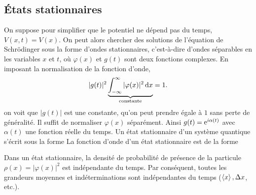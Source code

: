 \documentclass[12pt,fancy]{cours}
\begin{document}
\subsection{États stationnaires}

On suppose pour simplifier que le potentiel ne dépend pas du temps, $V(x,t)=V(x)$. On peut alors chercher des solutions de l'équation de Schrödinger sous la forme d'ondes stationnaires, c’est-à-dire d’ondes séparables en les variables $x$ et $t$,
où $\varphi(x)$ et $g(t)$ sont deux fonctions complexes.
%
En imposant la normalisation de la fonction d'onde,
\begin{equation}
|g(t)|^2\underbrace{\int_{-\infty}^{\infty}|\varphi(x)|^2\,\mathrm{d} x}_{\rm constante}=1.
\end{equation}
on voit que $|g(t)|$ est une constante, qu'on peut prendre égale à $1$ sans perte de généralité. Il suffit de normaliser $\varphi(x)$ séparément. Ainsi $g(t)=\mathrm{e}^{i\alpha(t)}$ avec $\alpha(t)$ une fonction réelle du temps. Un état stationnaire d'un système quantique s'écrit sous la forme
  La fonction d’onde d’un état stationnaire est de la forme




Dans un état stationnaire, la densité de probabilité de présence de la particule $\rho(x)=|\varphi(x)|^2$ est indépendante du temps. Par conséquent, toutes les grandeurs moyennes et indéterminations sont indépendantes du temps ($\left\langle {x} \right\rangle,\Delta x$, etc.).
\end{document}
